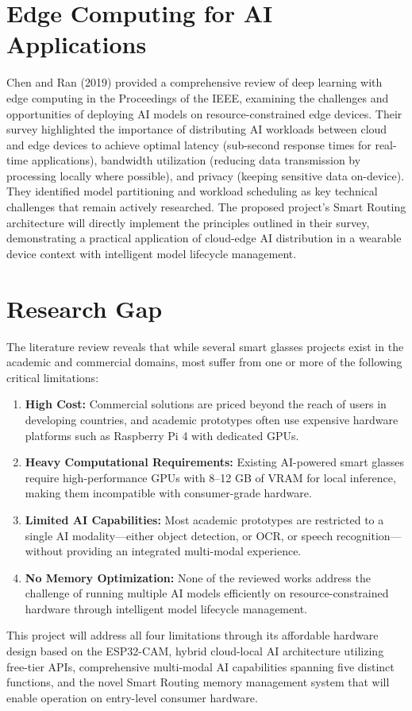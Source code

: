 \section{Edge Computing for AI Applications}
Chen and Ran (2019) provided a comprehensive review of deep learning with edge computing in the Proceedings of the IEEE, examining the challenges and opportunities of deploying AI models on resource-constrained edge devices. Their survey highlighted the importance of distributing AI workloads between cloud and edge devices to achieve optimal latency (sub-second response times for real-time applications), bandwidth utilization (reducing data transmission by processing locally where possible), and privacy (keeping sensitive data on-device). They identified model partitioning and workload scheduling as key technical challenges that remain actively researched. The proposed project's Smart Routing architecture will directly implement the principles outlined in their survey, demonstrating a practical application of cloud-edge AI distribution in a wearable device context with intelligent model lifecycle management.

\section{Research Gap}
The literature review reveals that while several smart glasses projects exist in the academic and commercial domains, most suffer from one or more of the following critical limitations:

\begin{enumerate}[leftmargin=1.5cm]
\item \textbf{High Cost:} Commercial solutions are priced beyond the reach of users in developing countries, and academic prototypes often use expensive hardware platforms such as Raspberry Pi 4 with dedicated GPUs.

\item \textbf{Heavy Computational Requirements:} Existing AI-powered smart glasses require high-performance GPUs with 8--12 GB of VRAM for local inference, making them incompatible with consumer-grade hardware.

\item \textbf{Limited AI Capabilities:} Most academic prototypes are restricted to a single AI modality---either object detection, or OCR, or speech recognition---without providing an integrated multi-modal experience.

\item \textbf{No Memory Optimization:} None of the reviewed works address the challenge of running multiple AI models efficiently on resource-constrained hardware through intelligent model lifecycle management.
\end{enumerate}

This project will address all four limitations through its affordable hardware design based on the ESP32-CAM, hybrid cloud-local AI architecture utilizing free-tier APIs, comprehensive multi-modal AI capabilities spanning five distinct functions, and the novel Smart Routing memory management system that will enable operation on entry-level consumer hardware.
